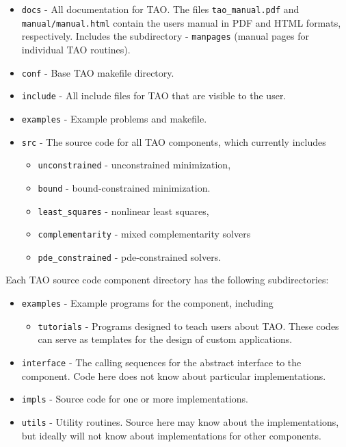 \begin{itemize}
\item \texttt{docs} - All documentation for TAO. The files \texttt{tao\_manual.pdf}
                   and \texttt{manual/manual.html} contain the users manual in
                   PDF and HTML formats, respectively. Includes
                   the subdirectory
 \subitem - \texttt{manpages} (manual pages for individual TAO routines).
\item \texttt{conf} - Base TAO makefile directory.  
\item \texttt{include} - All include files for TAO that are visible to the user.
\item \texttt{examples} - Example problems and makefile.
\item \texttt{src} - The source code for all TAO components, which
                  currently includes
 \begin{itemize}
 \item \texttt{unconstrained} - unconstrained minimization,
 \item \texttt{bound} - bound-constrained minimization.
 \item \texttt{least\_squares} - nonlinear least squares,
 \item \texttt{complementarity} - mixed complementarity solvers
 \item \texttt{pde\_constrained} - pde-constrained solvers.
 \end{itemize}
\end{itemize}

\noindent
Each TAO source code component directory has the following subdirectories:
\begin{itemize}
\item  \texttt{examples} - Example programs for the component, including
  \begin{itemize}
  \item \texttt{tutorials} - Programs designed to teach users about TAO.  These
          codes can serve as templates for the design of custom
applications.
  \end{itemize}
\item  \texttt{interface} - The calling sequences for the abstract interface  
        to the component.
        Code here does not know about particular implementations.
\item  \texttt{impls} - Source code for one or more implementations.
\item  \texttt{utils} - Utility routines.  Source here may know about the 
          implementations, but ideally will not know about implementations
          for other components.
\end{itemize}


